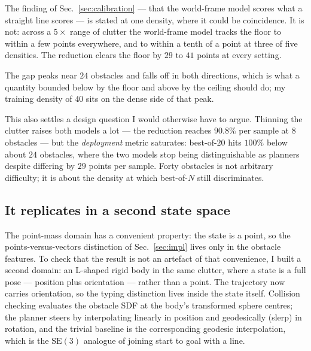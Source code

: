 \documentclass[11pt,a4paper]{article}
\newcommand{\SE}{\mathrm{SE}(3)}
\begin{document}
The finding of Sec.~\ref{sec:calibration} --- that the world-frame model scores
what a straight line scores --- is stated at one density, where it could be
coincidence. It is not: across a $5\times$ range of clutter the world-frame model
tracks the floor to within a few points everywhere, and to within a tenth of a
point at three of five densities. The reduction clears the floor by $29$ to $41$
points at every setting.

The gap peaks near $24$ obstacles and falls off in both directions, which is what
a quantity bounded below by the floor and above by the ceiling should do; my
training density of $40$ sits on the dense side of that peak.

This also settles a design question I would otherwise have to argue. Thinning the
clutter raises both models a lot --- the reduction reaches $90.8\%$ per sample at
$8$ obstacles --- but the \emph{deployment} metric saturates: best-of-$20$ hits
$100\%$ below about $24$ obstacles, where the two models stop being distinguishable
as planners despite differing by $29$ points per sample. Forty obstacles is not
arbitrary difficulty; it is about the density at which best-of-$N$ still
discriminates.

\subsection{It replicates in a second state space}
\label{sec:se3}

The point-mass domain has a convenient property: the state is a point, so the
points-versus-vectors distinction of Sec.~\ref{sec:impl} lives only in the
obstacle features. To check that the result is not an artefact of that
convenience, I built a second domain: an L-shaped rigid body in the same clutter,
where a state is a full pose --- position plus orientation --- rather than a
point. The trajectory now carries orientation, so the typing distinction lives
inside the state itself. Collision checking evaluates the obstacle SDF at the
body's transformed sphere centres; the planner steers by interpolating linearly
in position and geodesically (slerp) in rotation, and the trivial baseline is the
corresponding geodesic interpolation, which is the $\SE$ analogue of joining
start to goal with a line.
\end{document}
